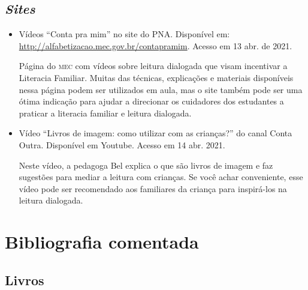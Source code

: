 \documentclass[11pt]{extarticle}
\begin{document}
\subsection{\textit{Sites}}

\begin{itemize}
\item Vídeos “Conta pra mim” no site do PNA. Disponível em: \url{http://alfabetizacao.mec.gov.br/contapramim}. 
Acesso em 13 abr. de 2021.

Página do \textsc{mec} com vídeos sobre leitura dialogada que visam incentivar a Literacia Familiar. Muitas das 
técnicas, explicações e materiais disponíveis nessa página podem ser utilizados em aula, mas o site também 
pode ser uma ótima indicação para ajudar a direcionar os cuidadores dos estudantes a praticar 
a literacia familiar e leitura dialogada.

\item Vídeo “Livros de imagem: como utilizar com as crianças?” do canal Conta Outra. Disponível em Youtube. 
Acesso em 14 abr. 2021. 

Neste vídeo, a pedagoga Bel explica o que são livros de imagem e faz sugestões para mediar a leitura com 
crianças. Se você achar conveniente, esse vídeo pode ser recomendado aos familiares da criança 
para inspirá-los na leitura dialogada. 
\end{itemize}

\section{Bibliografia comentada}

\subsection{Livros}
\end{document}
